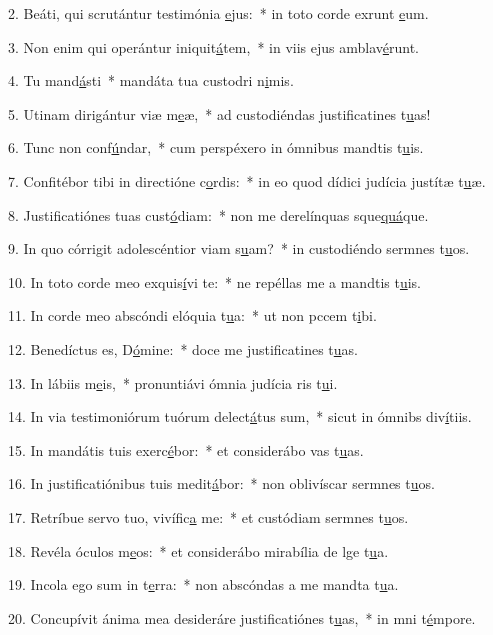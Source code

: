 2. Beáti, qui scrutántur testimónia \uline{e}jus:~* in toto corde exrunt \uline{e}um.\par 
3. Non enim qui operántur iniquit\uline{á}tem,~* in viis ejus amblav\uline{é}runt.\par 
4. Tu mand\uline{á}sti~* mandáta tua custodri n\uline{i}mis.\par 
5. Utinam dirigántur viæ m\uline{e}æ,~* ad custodiéndas justificatines t\uline{u}as!\par 
6. Tunc non conf\uline{ú}ndar,~* cum perspéxero in ómnibus mandtis t\uline{u}is.\par 
7. Confitébor tibi in directióne c\uline{o}rdis:~* in eo quod dídici judícia justítæ t\uline{u}æ.\par 
8. Justificatiónes tuas cust\uline{ó}diam:~* non me derelínquas sque\uline{quá}que.\par 
9. In quo córrigit adolescéntior viam s\uline{u}am?~* in custodiéndo sermnes t\uline{u}os.\par 
10. In toto corde meo exquis\uline{í}vi te:~* ne repéllas me a mandtis t\uline{u}is.\par 
11. In corde meo abscóndi elóquia t\uline{u}a:~* ut non pccem t\uline{i}bi.\par 
12. Benedíctus es, D\uline{ó}mine:~* doce me justificatines t\uline{u}as.\par 
13. In lábiis m\uline{e}is,~* pronuntiávi ómnia judícia ris t\uline{u}i.\par 
14. In via testimoniórum tuórum delect\uline{á}tus sum,~* sicut in ómnibs div\uline{í}tiis.\par 
15. In mandátis tuis exerc\uline{é}bor:~* et considerábo vas t\uline{u}as.\par 
16. In justificatiónibus tuis medit\uline{á}bor:~* non oblivíscar sermnes t\uline{u}os.\par 
17. Retríbue servo tuo, vivífic\uline{a} me:~* et custódiam sermnes t\uline{u}os.\par 
18. Revéla óculos m\uline{e}os:~* et considerábo mirabília de lge t\uline{u}a.\par 
19. Incola ego sum in t\uline{e}rra:~* non abscóndas a me mandta t\uline{u}a.\par 
20. Concupívit ánima mea desideráre justificatiónes t\uline{u}as,~* in mni t\uline{é}mpore.\par 

